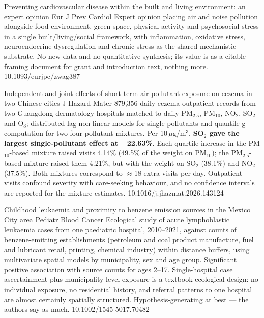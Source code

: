 \documentclass[10pt]{article}
\begin{document}
{Preventing cardiovascular disease within the built and living environment: an expert opinion}
{Eur J Prev Cardiol}
{Expert opinion placing air and noise pollution alongside food environment, green space,
physical activity and psychosocial stress in a single built/living/social framework, with
inflammation, oxidative stress, neuroendocrine dysregulation and chronic stress as the
shared mechanistic substrate. No new data and no quantitative synthesis; its value is as
a citable framing document for grant and introduction text, nothing more.}
{10.1093/eurjpc/zwag387}


{Independent and joint effects of short-term air pollutant exposure on eczema in two Chinese cities}
{J Hazard Mater}
{879{,}356 daily eczema outpatient records from two Guangdong dermatology hospitals
matched to daily PM$_{2.5}$, PM$_{10}$, NO$_2$, SO$_2$ and O$_3$; distributed lag
non-linear models for single pollutants and quantile g-computation for two
four-pollutant mixtures. Per 10\,$\mu$g/m$^3$, \textbf{SO$_2$ gave the largest
single-pollutant effect at +22.63\%}. Each quartile increase in the PM$_{10}$-based
mixture raised visits 4.14\% (49.5\% of the weight on PM$_{10}$); the PM$_{2.5}$-based
mixture raised them 4.21\%, but with the weight on SO$_2$ (38.1\%) and NO$_2$ (37.5\%).
Both mixtures correspond to $\approx$18 extra visits per day. Outpatient visits confound
severity with care-seeking behaviour, and no confidence intervals are reported for the
mixture estimates.}
{10.1016/j.jhazmat.2026.143124}

{Childhood leukaemia and proximity to benzene emission sources in the Mexico City area}
{Pediatr Blood Cancer}
{Ecological study of acute lymphoblastic leukaemia cases from one paediatric hospital,
2010--2021, against counts of benzene-emitting establishments (petroleum and coal product
manufacture, fuel and lubricant retail, printing, chemical industry) within distance
buffers, using multivariate spatial models by municipality, sex and age group.
Significant positive association with source counts for ages 2--17. Single-hospital case
ascertainment plus municipality-level exposure is a textbook ecological design: no
individual exposure, no residential history, and referral patterns to one hospital are
almost certainly spatially structured. Hypothesis-generating at best --- the authors
say as much.}
{10.1002/1545-5017.70482}
\end{document}
